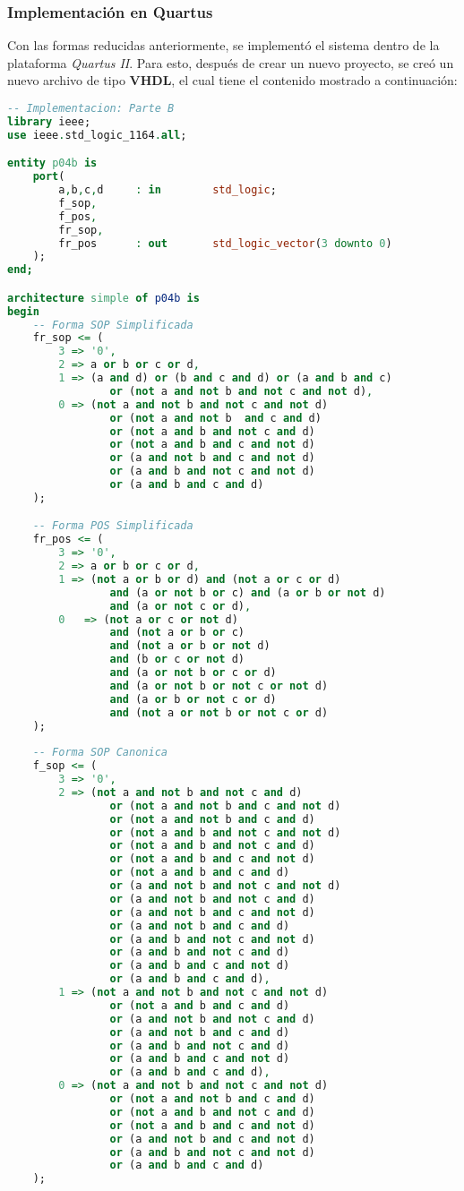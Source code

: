 \documentclass[../procedimientos.tex]{subfiles}
\begin{document}
\subsubsection{Implementación en Quartus}\label{subs:b_imp}
Con las formas reducidas anteriormente, se implementó el sistema dentro de la 
plataforma \textit{Quartus II}. Para esto, después de crear un nuevo proyecto, 
se creó un nuevo archivo de tipo \textbf{VHDL}, el cual tiene el contenido 
mostrado a continuación:
\begin{lstlisting}[language=VHDL, caption=Archivo VHDL (Parte B)]
-- Implementacion: Parte B
library ieee;
use ieee.std_logic_1164.all;

entity p04b is
	port(
		a,b,c,d		: in		std_logic;
		f_sop,
		f_pos,
		fr_sop,
		fr_pos 		: out		std_logic_vector(3 downto 0)
	);
end;

architecture simple of p04b is
begin
	-- Forma SOP Simplificada
	fr_sop <= (
		3 => '0',
		2 => a or b or c or d,
		1 => (a and d) or (b and c and d) or (a and b and c)
				or (not a and not b and not c and not d),
		0 => (not a and not b and not c and not d)
				or (not a and not b  and c and d)
				or (not a and b and not c and d)
				or (not a and b and c and not d)
				or (a and not b and c and not d)
				or (a and b and not c and not d)
				or (a and b and c and d)
	);

	-- Forma POS Simplificada
	fr_pos <= (
		3 => '0',
		2 => a or b or c or d,
		1 => (not a or b or d) and (not a or c or d)
				and (a or not b or c) and (a or b or not d)
				and (a or not c or d),
		0 	=> (not a or c or not d)
				and (not a or b or c)
				and (not a or b or not d)
				and (b or c or not d)
				and (a or not b or c or d)
				and (a or not b or not c or not d)
				and (a or b or not c or d)
				and (not a or not b or not c or d)
	);
					
	-- Forma SOP Canonica
	f_sop <= (
		3 => '0',
		2 => (not a and not b and not c and d)
				or (not a and not b and c and not d)
				or (not a and not b and c and d)
				or (not a and b and not c and not d)
				or (not a and b and not c and d)
				or (not a and b and c and not d)
				or (not a and b and c and d)
				or (a and not b and not c and not d)
				or (a and not b and not c and d)
				or (a and not b and c and not d)
				or (a and not b and c and d)
				or (a and b and not c and not d)
				or (a and b and not c and d)
				or (a and b and c and not d)
				or (a and b and c and d),
		1 => (not a and not b and not c and not d)
				or (not a and b and c and d)
				or (a and not b and not c and d)
				or (a and not b and c and d)
				or (a and b and not c and d)
				or (a and b and c and not d)
				or (a and b and c and d),
		0 => (not a and not b and not c and not d)
				or (not a and not b and c and d)
				or (not a and b and not c and d)
				or (not a and b and c and not d)
				or (a and not b and c and not d)
				or (a and b and not c and not d)
				or (a and b and c and d)
	);
	

\end{lstlisting}
\end{document}

